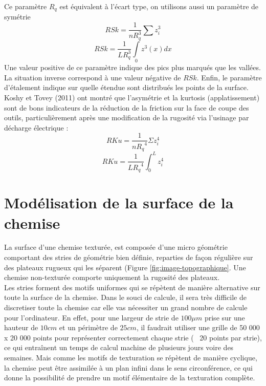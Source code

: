 Ce paramètre $R_q$ est équivalent à l’écart type, on utilisons aussi un paramètre de symétrie
\begin{equation}
	RSk=\frac{1}{n{R}_{q}^{3}}\sum {z}_{i}^{3}
\end{equation}
\begin{equation}
	RSk=\frac{1}{L{R}_{q}^{3}}\underset{0}{\int }{z}^{3}\left(x\right)dx
\end{equation}
Une valeur positive de ce paramètre indique des pics plus marqués que les vallées. La
situation inverse correspond à une valeur négative de $RSk$. Enfin, le paramètre d’étalement
indique sur quelle étendue sont distribués les points de la surface. Koshy et Tovey (2011) ont montré que l'asymétrie et la kurtosis (applatissement) sont de bons indicateurs de la réduction de la friction sur la face de coupe des outils, particulièrement après une modification de la rugosité via l'usinage par décharge électrique\cite{trobo2} :
\begin{equation}
	RKu=\frac{1}{n{R_q}^{4}}\Sigma {z}_{i}^{4}
\end{equation}
\begin{equation}
	RKu=\frac{1}{L{R_q}^{4}}\int_{0}^{L}{z}_{i}^{4}
\end{equation}
\section{Modélisation de la surface de la chemise}
La surface d’une chemise texturée, est composée d’une micro géométrie comportant des stries de géométrie bien définie, reparties de façon régulière sur des plateaux rugueux qui les séparent (Figure \ref{fig:image-topographique}. Une chemise non-texturée comporte uniquement la rugosité des plateaux.\\

Les stries forment des motifs uniformes qui se répètent de manière alternative sur toute la surface de la chemise. Dans le souci de calcule, il sera très difficile de discretiser toute la chemise car elle vas nécessiter un grand nombre de calcule pour l'ordinateur. En effet, pour une largeur de strie de $100 \mu m$ prise sur une hauteur de $10 cm$ et un périmètre de $25 cm$, il faudrait utiliser une grille de 50 000 x 20 000 points pour représenter correctement chaque strie (~ 20 points par strie), ce qui entraînent un temps de calcul machine de plusieurs jours voire des semaines. Mais comme les motifs de texturation se répètent de manière cyclique, la chemise peut être assimilée à un plan infini dans le sens circonférence, ce qui donne la possibilité de prendre un motif élémentaire de la texturation complète.\\

